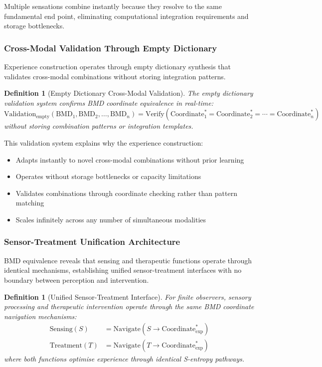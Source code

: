 \documentclass{article}
\newtheorem{definition}[theorem]{Definition}
\begin{document}
Multiple sensations combine instantly because they resolve to the same fundamental end point, eliminating computational integration requirements and storage bottlenecks.

\subsubsection{Cross-Modal Validation Through Empty Dictionary}

Experience construction operates through empty dictionary synthesis that validates cross-modal combinations without storing integration patterns.

\begin{definition}[Empty Dictionary Cross-Modal Validation]
The empty dictionary validation system confirms BMD coordinate equivalence in real-time:
\begin{equation}
\text{Validation}_{\text{empty}}(\text{BMD}_1, \text{BMD}_2, \ldots, \text{BMD}_n) = \text{Verify}(\text{Coordinate}_1^* = \text{Coordinate}_2^* = \cdots = \text{Coordinate}_n^*)
\end{equation}
without storing combination patterns or integration templates.
\end{definition}

This validation system explains why the experience construction:
\begin{itemize}
\item Adapts instantly to novel cross-modal combinations without prior learning
\item Operates without storage bottlenecks or capacity limitations
\item Validates combinations through coordinate checking rather than pattern matching
\item Scales infinitely across any number of simultaneous modalities
\end{itemize}

\subsubsection{Sensor-Treatment Unification Architecture}

BMD equivalence reveals that sensing and therapeutic functions operate through identical mechanisms, establishing unified sensor-treatment interfaces with no boundary between perception and intervention.

\begin{definition}[Unified Sensor-Treatment Interface]
For finite observers, sensory processing and therapeutic intervention operate through the same BMD coordinate navigation mechanisms:
\begin{align}
\text{Sensing}(S) &= \text{Navigate}(S \rightarrow \text{Coordinate}_{\text{exp}}^*) \\
\text{Treatment}(T) &= \text{Navigate}(T \rightarrow \text{Coordinate}_{\text{exp}}^*)
\end{align}
where both functions optimise experience through identical S-entropy pathways.
\end{definition}
\end{document}

